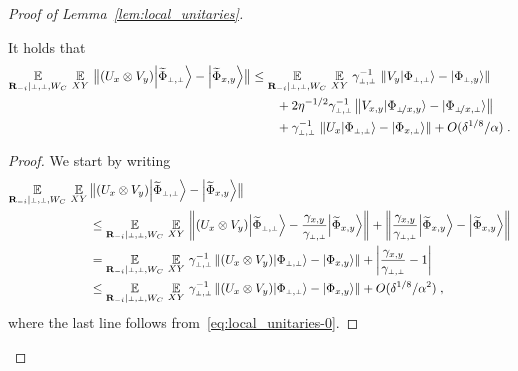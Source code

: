 \begin{proof}[Proof of Lemma~\ref{lem:local_unitaries}]
\begin{claim}\label{claim:good-i-2}
It holds that
\begin{align}
 \Ex_{\bR_\mi | \dummy, \dummy, W_C} \, \Ex_{XY} \, \big \| (U_{x} \otimes V_{y}) \bigket{\wt{\Phi}_{\pp}} - \bigket{\wt{\Phi}_{\xy}} \big\|  
 &\leq \Ex_{\bR_\mi | \dummy, \dummy, W_C} \, \Ex_{XY} \, \gamma_\pp^{-1} \, \left \| V_y \ket{{\Phi}_{\dummy,\dummy}} - \ket{{\Phi}_{\dummy,y}} \right \|\label{eq:good-i-2a}\\
 &\qquad + 2\eta^{-1/2} \gamma_\pp^{-1} \,\big \|  V_{x,y} \ket{\Phi_{\dummyx,y}} - \ket{{\Phi}_{\dummyx,\dummy}} \big \| \label{eq:good-i-2b}\\
&  \qquad + \gamma_\pp^{-1} \, \left \|  U_x \ket{{\Phi}_{\dummy,\dummy}} -  \ket{{\Phi}_{x,\dummy}} \right \| + O(\delta^{1/8}/\alpha)\;.\label{eq:good-i-2c}
\end{align}
\end{claim}

\begin{proof}
We start by writing 
\begin{align}
 \Ex_{\bR_\mi | \dummy, \dummy, W_C} \, \Ex_{XY} \,& \big \| (U_{x} \otimes V_{y}) \bigket{\wt{\Phi}_{\pp}} - \bigket{\wt{\Phi}_{\xy}} \big\| \notag \\
&\leq  \Ex_{\bR_\mi | \dummy, \dummy, W_C} \, \Ex_{XY} \, \left \| (U_{x} \otimes V_{y}) \bigket{\wt{\Phi}_{\pp}} - \frac{\gamma_\xy}{\gamma_\pp} \bigket{\wt{\Phi}_{\xy}} \right\| +  \left \| \frac{\gamma_\xy}{\gamma_\pp} \bigket{\wt{\Phi}_{\xy}} - \bigket{\wt{\Phi}_{\xy}} \right\| \notag \\
&= \Ex_{\bR_\mi | \dummy, \dummy, W_C} \, \Ex_{XY} \, \gamma_\pp^{-1} \left \| (U_{x} \otimes V_{y}) \bigket{{\Phi}_{\pp}} - \bigket{{\Phi}_{\xy}} \right\| +  \left | \frac{\gamma_\xy}{\gamma_\pp} -1  \right| \notag \\
&\leq \Ex_{\bR_\mi | \dummy, \dummy, W_C} \, \Ex_{XY} \, \gamma_\pp^{-1} \left \| (U_{x} \otimes V_{y}) \bigket{{\Phi}_{\pp}} - \bigket{{\Phi}_{\xy}} \right\| + O(\delta^{1/8}/\alpha^2) \;,\label{eq:local_unitaries-1}
\end{align}
where the last line follows from~\eqref{eq:local_unitaries-0}.


\end{proof}
\end{proof}
